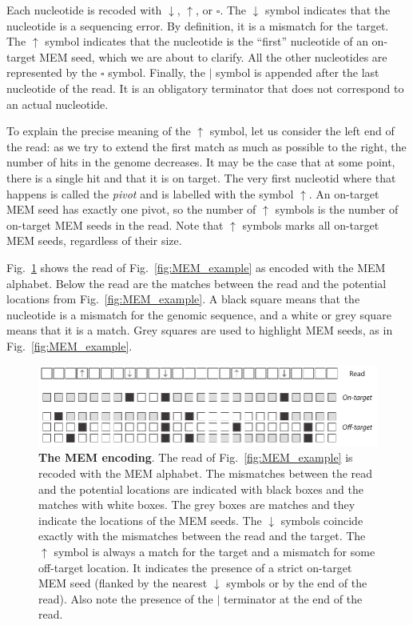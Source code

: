 \documentclass{article}
\begin{document}
Each nucleotide is recoded with $\downarrow$, $\uparrow$, or $\square$.
The $\downarrow$ symbol indicates that the nucleotide is a sequencing
error. By definition, it is a mismatch for the target. The $\uparrow$
symbol indicates that the nucleotide is the ``first'' nucleotide of an
on-target MEM seed, which we are about to clarify. All the other
nucleotides are represented by the $\square$ symbol. Finally, the $|$
symbol is appended after the last nucleotide of the read. It is an
obligatory terminator that does not correspond to an actual nucleotide.

To explain the precise meaning of the $\uparrow$ symbol, let us consider
the left end of the read: as we try to extend the first match as much as
possible to the right, the number of hits in the genome decreases. It may
be the case that at some point, there is a single hit and that it is on
target. The very first nucleotid where that happens is called the
\emph{pivot} and is labelled with the symbol $\uparrow$. An on-target MEM
seed has exactly one pivot, so the number of $\uparrow$ symbols is the
number of on-target MEM seeds in the read. Note that $\uparrow$ symbols
marks all on-target MEM seeds, regardless of their size.

Fig.~\ref{fig:sketch_MEM} shows the read of Fig.~\ref{fig:MEM_example} as
encoded with the MEM alphabet. Below the read are the matches between the
read and the potential locations from Fig.~\ref{fig:MEM_example}. A black
square means that the nucleotide is a mismatch for the genomic sequence,
and a white or grey square means that it is a match. Grey squares are used
to highlight MEM seeds, as in Fig.~\ref{fig:MEM_example}.


\begin{figure}[h]
\centering
\includegraphics[scale=.85]{sketch_MEM.pdf}
\caption{\textbf{The MEM encoding}.
The read of Fig.~\ref{fig:MEM_example} is recoded with the MEM alphabet.
The mismatches between the read and the potential locations are indicated
with black boxes and the matches with white boxes. The grey boxes are
matches and they indicate the locations of the MEM seeds. The $\downarrow$
symbols coincide exactly with the mismatches between the read and the
target. The $\uparrow$ symbol is always a match for the target and a
mismatch for some off-target location. It indicates the presence of a
strict on-target MEM seed (flanked by the nearest $\downarrow$ symbols or
by the end of the read). Also note the presence of the $|$ terminator at
the end of the read.}
\label{fig:sketch_MEM}
\end{figure}
\end{document}

